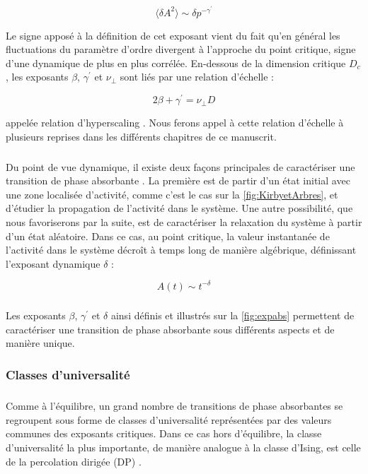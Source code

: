 \begin{equation}
	\langle \delta A^2\rangle \sim \delta p^{-\gamma^\prime}
\end{equation}

\noindent Le signe apposé à la définition de cet exposant vient du fait qu'en général les fluctuations du paramètre d'ordre divergent à l'approche du point critique, signe d'une dynamique de plus en plus corrélée. En-dessous de la dimension critique $D_c$, les exposants $\beta$, $\gamma^\prime$ et $\nu_\perp$ sont liés par une relation d'échelle :

\begin{equation}
	2\beta + \gamma^\prime = \nu_\perp D
\end{equation}

\noindent appelée relation d'hyperscaling \cite{lubeck_universal_2004}. Nous ferons appel à cette relation d'échelle à plusieurs reprises dans les différents chapitres de ce manuscrit.

\subparagraph{}Du point de vue dynamique, il existe deux façons principales de caractériser une transition de phase absorbante \cite{lubeck_universal_2004}. La première est de partir d'un état initial avec une zone localisée d'activité, comme c'est le cas sur la \autoref{fig:KirbyetArbres}, et d'étudier la propagation de l'activité dans le système. Une autre possibilité, que nous favoriserons par la suite, est de caractériser la relaxation du système à partir d'un état aléatoire. Dans ce cas, au point critique, la valeur instantanée de l'activité dans le système décroît à temps long de manière algébrique, définissant l'exposant dynamique $\delta$ :

\begin{equation}
	A(t) \sim t^{-\delta}
\end{equation}

\subparagraph{}Les exposants $\beta$, $\gamma^\prime$ et $\delta$ ainsi définis et illustrés sur la \autoref{fig:expabs} permettent de caractériser une transition de phase absorbante sous différents aspects et de manière unique. 

\subsubsection{Classes d'universalité}

\subparagraph{}Comme à l'équilibre, un grand nombre de transitions de phase absorbantes se regroupent sous forme de classes d'universalité représentées par des valeurs communes des exposants critiques. Dans ce cas hors d'équilibre, la classe d'universalité la plus importante, de manière analogue à la classe d'Ising, est celle de la percolation dirigée (DP) \cite{hinrichsen_non_equilibrium_2000,lubeck_universal_2004}. 

